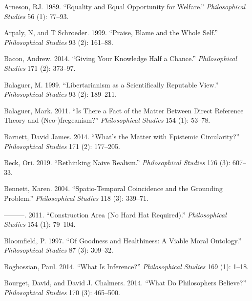 \documentclass[
  10pt,
  letterpaper,
  DIV=11,
  numbers=noendperiod,
  twoside]{scrartcl}
\newlength{\cslhangindent}
\newenvironment{CSLReferences}[2] %
 {\begin{list}{}{%
  \setlength{\itemindent}{0pt}
  \setlength{\leftmargin}{0pt}
  \setlength{\parsep}{0pt}
  \ifodd #1
   \setlength{\leftmargin}{\cslhangindent}
   \setlength{\itemindent}{-1\cslhangindent}
  \fi
  \setlength{\itemsep}{#2\baselineskip}}}
 {\end{list}}
\begin{document}
\label{refs}
\begin{CSLReferences}{1}{0}
Arneson, RJ. 1989. {``Equality and Equal Opportunity for Welfare.''}
\emph{Philosophical Studies} 56 (1): 77--93.

Arpaly, N, and T Schroeder. 1999. {``Praise, Blame and the Whole
Self.''} \emph{Philosophical Studies} 93 (2): 161--88.

Bacon, Andrew. 2014. {``Giving Your Knowledge Half a Chance.''}
\emph{Philosophical Studies} 171 (2): 373--97.

Balaguer, M. 1999. {``Libertarianism as a Scientifically Reputable
View.''} \emph{Philosophical Studies} 93 (2): 189--211.

Balaguer, Mark. 2011. {``Is There a Fact of the Matter Between Direct
Reference Theory and (Neo-)fregeanism?''} \emph{Philosophical Studies}
154 (1): 53--78.

Barnett, David James. 2014. {``What's the Matter with Epistemic
Circularity?''} \emph{Philosophical Studies} 171 (2): 177--205.

Beck, Ori. 2019. {``Rethinking Naive Realism.''} \emph{Philosophical
Studies} 176 (3): 607--33.

Bennett, Karen. 2004. {``Spatio-Temporal Coincidence and the Grounding
Problem.''} \emph{Philosophical Studies} 118 (3): 339--71.

---------. 2011. {``Construction Area (No Hard Hat Required).''}
\emph{Philosophical Studies} 154 (1): 79--104.

Bloomfield, P. 1997. {``Of Goodness and Healthiness: A Viable Moral
Ontology.''} \emph{Philosophical Studies} 87 (3): 309--32.

Boghossian, Paul. 2014. {``What Is Inference?''} \emph{Philosophical
Studies} 169 (1): 1--18.

Bourget, David, and David J. Chalmers. 2014. {``What Do Philosophers
Believe?''} \emph{Philosophical Studies} 170 (3): 465--500.


\end{CSLReferences}
\end{document}
